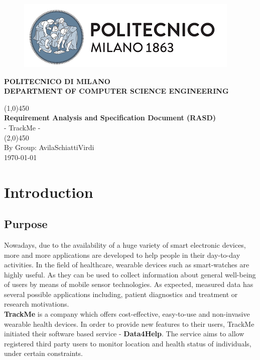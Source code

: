 \documentclass[12pt]{article}
\begin{document}
\begin{titlepage}
\begin{center}
\begin{figure}[h]
\includegraphics[scale=1]{PolimiLogo.png}
\centering
\end{figure}
\centering\textbf{POLITECNICO DI MILANO}\\
\centering\textbf{DEPARTMENT OF COMPUTER SCIENCE ENGINEERING}
\vspace*{4cm}

\line(1,0){450}\\
\Large{\textbf{Requirement Analysis and Specification Document (RASD)}}\\[3mm]
\Large{- TrackMe -}\\
\line(2,0){450}\\
\vfill
By Group: AvilaSchiattiVirdi\\


\today
\end{center}
\end{titlepage}

\tableofcontents
\thispagestyle{empty}
\newpage
\listoffigures
\listoftables
\thispagestyle{empty}
\clearpage
\setcounter{page}{1}

\section{Introduction}
\subsection{Purpose}
Nowadays, due to the availability of a huge variety of smart electronic devices, more and more applications are developed to help people in their day-to-day activities. In the field of healthcare, wearable devices such as smart-watches are highly useful. As they can be used to collect information about general well-being of users by means of mobile sensor technologies. As expected, measured data has several possible applications including, patient diagnostics and treatment or research motivations. \\

\textbf{TrackMe} is a company which offers cost-effective, easy-to-use and non-invasive wearable health devices. In order to provide new features to their users, TrackMe initiated their software based service - \textbf{Data4Help}. The service aims to allow registered third party users to monitor location and health status of individuals, under certain constraints. \\
\end{document}
